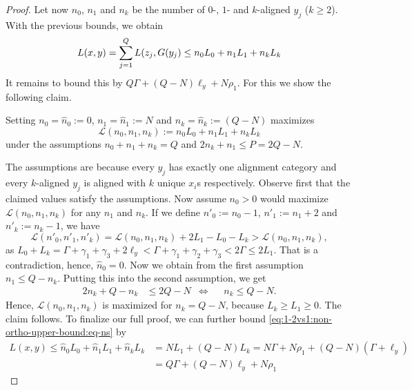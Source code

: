 \begin{proof}
Let now $n_0$, $n_1$ and $n_k$ be the number of $0$-, $1$- and $k$-aligned $y_j$ ($k \geq 2$).
With the previous bounds, we obtain
\begin{equation}
\label{eq:1-2vs1:non-ortho-upper-bound:eq-ns}
	L(x,y) = \sum_{j=1}^Q L(z_j, G(y_j) \leq n_0 L_0 + n_1 L_1 + n_k L_k 
\end{equation}
It remains to bound this by $Q\Gamma + (Q-N)\ell_y + N\rho_1$. 
For this we show the following claim.
\begin{claim}
Setting $n_0 = \hat{n}_0 := 0$, $n_1 = \hat{n}_1 := N$ and $n_k = \hat{n}_k := (Q-N)$ maximizes
\[
\mathcal{L}(n_0, n_1, n_k) := n_0 L_0 + n_1 L_1 + n_k L_k
\]
under the assumptions $n_0 + n_1 + n_k = Q$ and $2n_k + n_1 \leq P = 2Q - N$.
\end{claim}
The assumptions are because every $y_j$ has exactly one alignment category and every $k$-aligned $y_j$ is aligned with $k$ unique $x_i$s respectively.
Observe first that the claimed values satisfy the assumptions.
Now assume $n_0 > 0$ would maximize $\mathcal{L}(n_0, n_1, n_k)$ for any $n_1$ and $n_k$.
If we define $n'_0 := n_0 - 1$, $n'_1 := n_1 + 2$ and $n'_k := n_k - 1$, we have
\[
	\mathcal{L}(n'_0, n'_1, n'_k) = \mathcal{L}(n_0, n_1, n_k) + 2L_1 - L_0 - L_k > \mathcal{L}(n_0, n_1, n_k),
\]
as $L_0 + L_k = \Gamma + \gamma_1 + \gamma_3 + 2\ell_y < \Gamma + \gamma_1 + \gamma_2 + \gamma_3 < 2\Gamma \leq 2L_1$.
That is a contradiction, hence, $\hat{n}_0 = 0$.
Now we obtain from the first assumption $n_1 \leq Q - n_k$.
Putting this into the second assumption, we get
\begin{align*}
2n_k + Q - n_k &\leq 2Q - N %
&\Leftrightarrow& %
&n_k \leq Q - N.
\end{align*}
Hence, $\mathcal{L}(n_0, n_1, n_k)$ is maximized for $n_k = Q-N$, because $L_k \geq L_1 \geq 0$. 
The claim follows.
%
%
To finalize our full proof, we can further bound \autoref{eq:1-2vs1:non-ortho-upper-bound:eq-ns} by
\begin{align*}
L(x,y) \leq \hat{n}_0 L_0 + \hat{n}_1 L_1 + \hat{n}_k L_k &= NL_1 + (Q-N) L_k  = N\Gamma + N\rho_1 + (Q-N)(\Gamma + \ell_y) \\
	&= Q\Gamma + (Q-N)\ell_y + N\rho_1
\end{align*}%
\end{proof}%
%



